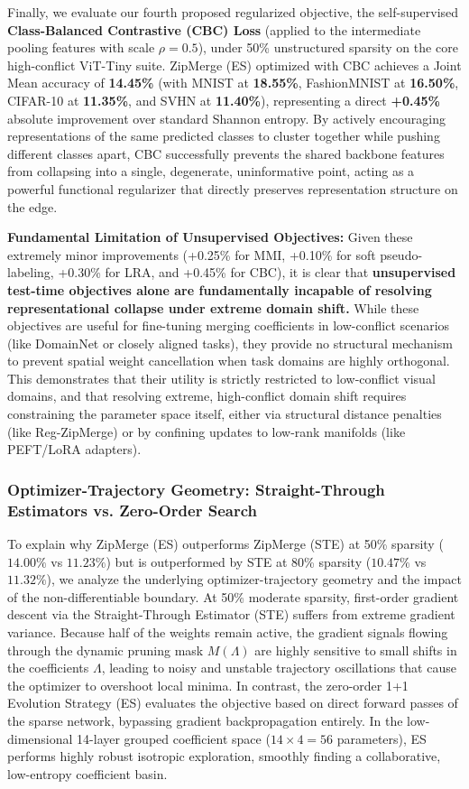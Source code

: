 Finally, we evaluate our fourth proposed regularized objective, the self-supervised \textbf{Class-Balanced Contrastive (CBC) Loss} (applied to the intermediate pooling features with scale $\rho = 0.5$), under 50\% unstructured sparsity on the core high-conflict ViT-Tiny suite. ZipMerge (ES) optimized with CBC achieves a Joint Mean accuracy of \textbf{14.45\%} (with MNIST at \textbf{18.55\%}, FashionMNIST at \textbf{16.50\%}, CIFAR-10 at \textbf{11.35\%}, and SVHN at \textbf{11.40\%}), representing a direct \textbf{+0.45\%} absolute improvement over standard Shannon entropy. By actively encouraging representations of the same predicted classes to cluster together while pushing different classes apart, CBC successfully prevents the shared backbone features from collapsing into a single, degenerate, uninformative point, acting as a powerful functional regularizer that directly preserves representation structure on the edge.

\textbf{Fundamental Limitation of Unsupervised Objectives:} Given these extremely minor improvements (+0.25\% for MMI, +0.10\% for soft pseudo-labeling, +0.30\% for LRA, and +0.45\% for CBC), it is clear that \textbf{unsupervised test-time objectives alone are fundamentally incapable of resolving representational collapse under extreme domain shift.} While these objectives are useful for fine-tuning merging coefficients in low-conflict scenarios (like DomainNet or closely aligned tasks), they provide no structural mechanism to prevent spatial weight cancellation when task domains are highly orthogonal. This demonstrates that their utility is strictly restricted to low-conflict visual domains, and that resolving extreme, high-conflict domain shift requires constraining the parameter space itself, either via structural distance penalties (like Reg-ZipMerge) or by confining updates to low-rank manifolds (like PEFT/LoRA adapters).

\subsubsection{Optimizer-Trajectory Geometry: Straight-Through Estimators vs. Zero-Order Search}
To explain why ZipMerge (ES) outperforms ZipMerge (STE) at 50\% sparsity ($14.00\%$ vs $11.23\%$) but is outperformed by STE at 80\% sparsity ($10.47\%$ vs $11.32\%$), we analyze the underlying optimizer-trajectory geometry and the impact of the non-differentiable boundary. At 50\% moderate sparsity, first-order gradient descent via the Straight-Through Estimator (STE) suffers from extreme gradient variance. Because half of the weights remain active, the gradient signals flowing through the dynamic pruning mask $M(\Lambda)$ are highly sensitive to small shifts in the coefficients $\Lambda$, leading to noisy and unstable trajectory oscillations that cause the optimizer to overshoot local minima. In contrast, the zero-order 1+1 Evolution Strategy (ES) evaluates the objective based on direct forward passes of the sparse network, bypassing gradient backpropagation entirely. In the low-dimensional 14-layer grouped coefficient space ($14 \times 4 = 56$ parameters), ES performs highly robust isotropic exploration, smoothly finding a collaborative, low-entropy coefficient basin.

